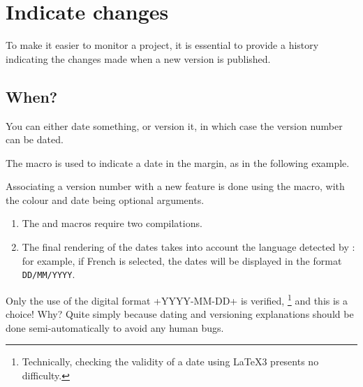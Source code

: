 \documentclass[10pt, a4paper]{tutodoc}
\begin{document}
\section{Indicate changes}

To make it easier to monitor a project, it is essential to provide a history indicating the changes made when a new version is published.



\subsection{When?}

You can either date something, or version it, in which case the version number can be dated.




\begin{tdocexa}
    The  macro is used to indicate a date in the margin, as in the following example.

\end{tdocexa}




\begin{tdocexa}
    Associating a version number with a new feature is done using the  macro, with the colour and date being optional arguments.

\end{tdocexa}


\begin{tdocimp}
    \begin{enumerate}[wide]
        \item The  and  macros require two compilations.

        \item The final rendering of the dates takes into account the language detected by \thisproj{}: for example, if French is selected, the dates will be displayed in the format \texttt{DD/MM/YYYY}.
    \end{enumerate}
\end{tdocimp}


\begin{tdoccaut}
    Only the use of the digital format \tdocinlatex+YYYY-MM-DD+ is verified,
    \footnote{
        Technically, checking the validity of a date using \LaTeX3 presents no difficulty.
    }
    and this is a choice! Why? Quite simply because dating and versioning explanations should be done semi-automatically to avoid any human bugs.
\end{tdoccaut}
\end{document}
